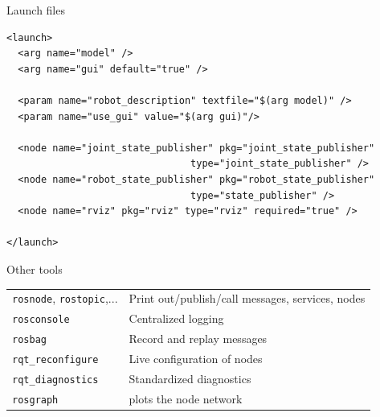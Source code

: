\documentclass[compress]{beamer}
\begin{document}
\begin{frame}[fragile]{Launch files}

\begin{verbatim}
<launch>
  <arg name="model" />
  <arg name="gui" default="true" />

  <param name="robot_description" textfile="$(arg model)" />
  <param name="use_gui" value="$(arg gui)"/>

  <node name="joint_state_publisher" pkg="joint_state_publisher" 
                                type="joint_state_publisher" />
  <node name="robot_state_publisher" pkg="robot_state_publisher" 
                                type="state_publisher" />
  <node name="rviz" pkg="rviz" type="rviz" required="true" />

</launch>
\end{verbatim}


\end{frame}



\begin{frame}{Other tools}
    \begin{table}[]
        \begin{tabularx}{\linewidth}{l>{\raggedright}X}
            \toprule
            \texttt{rosnode}, \texttt{rostopic},... & Print out/publish/call messages, services, nodes \tabularnewline
            \texttt{rosconsole} & Centralized logging \tabularnewline
            \texttt{rosbag} & Record and replay messages \tabularnewline
            \texttt{rqt\_reconfigure} & Live configuration of nodes \tabularnewline
            \texttt{rqt\_diagnostics} & Standardized diagnostics \tabularnewline
            \texttt{rosgraph} & plots the node network \tabularnewline
            \bottomrule
        \end{tabularx}
    \end{table}
\end{frame}
\end{document}
